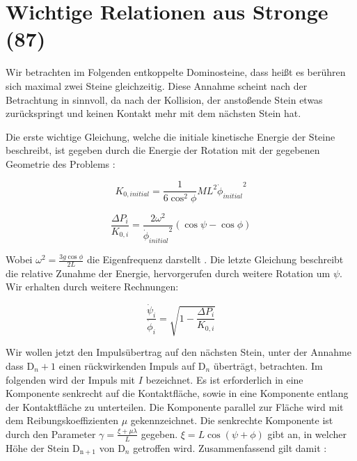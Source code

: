 \section{Wichtige Relationen aus Stronge (87) \label{Stronge87}}

Wir betrachten im Folgenden entkoppelte Dominosteine, dass heißt es berühren sich maximal zwei Steine gleichzeitig. Diese Annahme scheint nach der Betrachtung in \cite{Stronge87} sinnvoll, da nach der Kollision, der anstoßende Stein etwas zurückspringt und keinen Kontakt mehr mit dem nächsten Stein hat.

Die erste wichtige Gleichung, welche die initiale kinetische Energie der Steine beschreibt, ist gegeben durch die Energie der Rotation mit der gegebenen Geometrie des Problems \cite{Stronge87}: 

\begin{equation}
    \label{eq:K_0i}
	K_{0,initial} = \frac{1}{6 \cos^2\phi} M L^2 {\dot{\phi}_{initial}}^2 
\end{equation}

\begin{equation}
    \label{eq:frac_energy}
    \frac{\Delta P_i}{K_{0,i}} = \frac{2\omega^2}{{\dot{\phi}_{initial}}^2} (\cos\psi - \cos\phi)
\end{equation}

Wobei $ \omega^2 = \frac{3g\cos\phi}{2L} $ die Eigenfrequenz darstellt \cite{Stronge87}. Die letzte Gleichung beschreibt die relative Zunahme der Energie, hervorgerufen durch weitere Rotation um $ \psi $. Wir erhalten durch weitere Rechnungen:

\begin{equation}
	\label{eq:frac_freq}
	\frac{\dot{\psi}_{i}}{\dot{\phi}_{i}} = \sqrt{1- \frac{\Delta P_i}{K_{0,i}}}
\end{equation}

Wir wollen jetzt den Impulsübertrag auf den nächsten Stein, unter der Annahme dass $\mathrm{D}_n+1$ einen rückwirkenden Impuls auf $\mathrm{D}_n$ überträgt, betrachten. Im folgenden wird der Impuls mit $I$ bezeichnet. Es ist erforderlich in eine Komponente senkrecht auf die Kontaktfläche, sowie in eine Komponente entlang der Kontaktfläche zu unterteilen. Die Komponente parallel zur Fläche wird mit dem Reibungskoeffizienten $\mu$ gekennzeichnet. Die senkrechte Komponente ist durch den Parameter $\gamma = \frac{\xi + \mu\lambda}{L}$ gegeben. $\xi = L \cos(\psi + \phi)$ gibt an, in welcher Höhe der Stein $\mathrm{D_{n+1}}$ von $\mathrm{D}_{n}$ getroffen wird. Zusammenfassend gilt damit \cite{Stronge87}:
 
